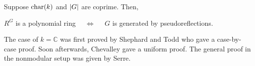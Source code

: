 \documentclass[12pt]{article}
\begin{document}
\begin{thm}
	Suppose $\operatorname{char}(k)$ and ${\left\lvert G \right\lvert}$ are coprime. Then,
	\begin{center}
		$R^{G}$ is a polynomial ring $\quad\Leftrightarrow\quad$ $G$ is generated by pseudoreflections.
	\end{center}
\end{thm}
The case of $k = \mathbb{C}$ was first proved by Shephard and Todd who gave a case-by-case proof. Soon afterwards, Chevalley gave a uniform proof. The general proof in the nonmodular setup was given by Serre.

\printbibliography
\end{document}
